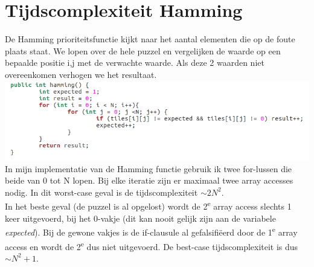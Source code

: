 \documentclass[11pt, a4paper]{article}
\begin{document}
\section*{Tijdscomplexiteit Hamming}
De Hamming prioriteitsfunctie kijkt naar het aantal elementen die op de foute plaats staat. We lopen over de hele puzzel en vergelijken de waarde op een bepaalde positie i,j met de verwachte waarde. Als deze 2 waarden niet overeenkomen verhogen we het resultaat.\\
\includegraphics[width=\textwidth]{hamming}\\
In mijn implementatie van de Hamming functie gebruik ik twee for-lussen die beide van 0 tot N lopen. Bij elke iteratie zijn er maximaal twee array accesses nodig. In dit worst-case geval is de tijdscomplexiteit $\sim 2N^2$.\\
In het beste geval (de puzzel is al opgelost) wordt de 2\textsuperscript{e} array access slechts 1 keer uitgevoerd, bij het 0-vakje (dit kan nooit gelijk zijn aan de variabele \emph{expected}). Bij de gewone vakjes is de if-clausule al gefalsifi\"eerd door de 1\textsuperscript{e} array access en wordt de 2\textsuperscript{e} dus niet uitgevoerd. De best-case tijdscomplexiteit is dus $\sim N^2 + 1$.
\end{document}
